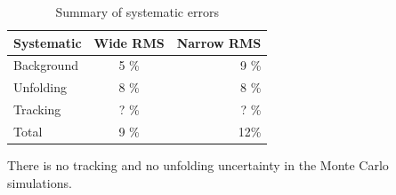 \begin{table}[htb]
\centering
\caption{Summary of systematic errors}
\label{tab:systematics}
\begin{tabular}{ l | c | r }
  Systematic & Wide RMS & Narrow RMS \\
    \hline			
  Background & 5 \% & 9 \% \\
  Unfolding & 8 \% & 8 \% \\
  Tracking & ? \% & ? \% \\
  Total & 9 \% & 12\% \\
  \hline
  \end{tabular}
  \end{table}

There is no tracking and no unfolding uncertainty in the Monte Carlo simulations. 


%
%
